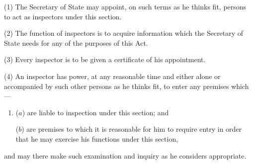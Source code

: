 \documentclass[12pt,a4paper]{article}
\begin{document}
%
%
%
%
%

(1) The Secretary of State may appoint, on such terms as he thinks fit, persons to act as inspectors under this section.

(2) The function of inspectors is to acquire information which the Secretary of State needs for any of the purposes of this Act.

(3) Every inspector is to be given a certificate of his appointment.

(4) An inspector has power, at any reasonable time and either alone or accompanied by such other persons as he thinks fit, to enter any premises which—
\begin{enumerate}\item[]
($a$) are liable to inspection under this section; and

($b$) are premises to which it is reasonable for him to require entry in order that he may exercise his functions under this section,
\end{enumerate}
and may there make such examination and inquiry as he considers appropriate.
\end{document}
